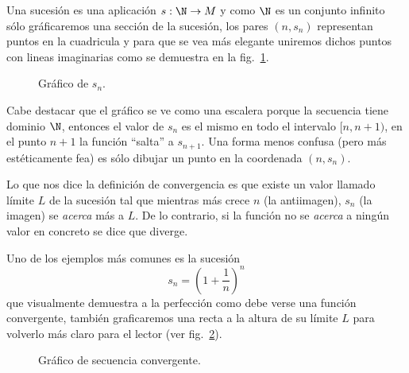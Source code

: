 \documentclass[11pt,oneside,a4paper]{book}
\begin{document}
Una sucesión es una aplicación $s:\N\rightarrow M$ y como $\N$ es un conjunto infinito sólo gráficaremos una sección de la sucesión, los pares $(n,s_n)$ representan puntos en la cuadricula y para que se vea más elegante uniremos dichos puntos con lineas imaginarias como se demuestra en la fig.~\ref{fig:demo-sec-graph}.
\begin{figure}
	\centering
	\caption{Gráfico de $s_n$.}
	\label{fig:demo-sec-graph}
\end{figure}

Cabe destacar que el gráfico se ve como una escalera porque la secuencia tiene dominio $\N$, entonces el valor de $s_n$ es el mismo en todo el intervalo $[n,n+1)$, en el punto $n+1$ la función ``salta'' a $s_{n+1}$. Una forma menos confusa (pero más estéticamente fea) es sólo dibujar un punto en la coordenada $(n,s_n)$.

Lo que nos dice la definición de convergencia es que existe un valor llamado límite $L$ de la sucesión tal que mientras más crece $n$ (la antiimagen), $s_n$ (la imagen) se \textit{acerca} más a $L$. De lo contrario, si la función no se \textit{acerca} a ningún valor en concreto se dice que diverge.

Uno de los ejemplos más comunes es la sucesión
$$s_n=\left(1+\frac 1n\right)^n$$
que visualmente demuestra a la perfección como debe verse una función convergente, también graficaremos una recta a la altura de su límite $L$ para volverlo más claro para el lector (ver fig.~\ref{fig:euler-graph}).
\begin{figure}
	\centering
	\caption{Gráfico de secuencia convergente.}
	\label{fig:euler-graph}
\end{figure}
\end{document}

